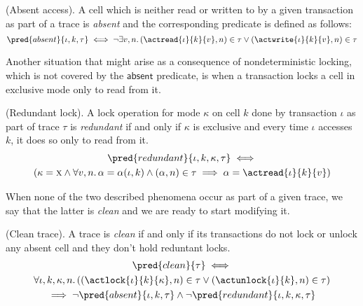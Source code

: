 \begin{defn}
	(Absent access).
	A cell which is neither read or written to by a given transaction as part of a trace is \emph{absent} and the corresponding predicate is defined as follows:
	\[
		\pred{absent}{\iota, k, \tau}
			\iff
		\lnot \exists v, n \ldotp (\actread{\iota}{k}{v}, n) \in \tau \lor (\actwrite{\iota}{k}{v}, n) \in \tau
	\]
\end{defn}

Another situation that might arise as a consequence of nondeterministic locking, which is not covered by the $\mathsf{absent}$ predicate, is when a transaction locks a cell in exclusive mode only to read from it.
\begin{defn}
	(Redundant lock).
	A lock operation for mode $\kappa$ on cell $k$ done by transaction $\iota$ as part of trace $\tau$ is \emph{redundant} if and only if $\kappa$ is exclusive and every time $\iota$ accesses $k$, it does so only to read from it.
	\begin{gather*}
		\pred{redundant}{\iota, k, \kappa, \tau}
			\iff \\
		\left( \kappa = \textsc{x} \land \forall v, n \ldotp \alpha = \alpha(\iota, k) \land (\alpha, n) \in \tau \implies \alpha = \actread{\iota}{k}{v} \right)
	\end{gather*}
\end{defn}

When none of the two described phenomena occur as part of a given trace, we say that the latter is \textit{clean} and we are ready to start modifying it.
\begin{defn}
	(Clean trace).
	A trace is \emph{clean} if and only if its transactions do not lock or unlock any absent cell and they don't hold reduntant locks.
	\begin{gather*}
		\pred{clean}{\tau} \iff \\
		\forall \iota, k, \kappa, n \ldotp
		\left( (\actlock{\iota}{k}{\kappa}, n) \in \tau \lor (\actunlock{\iota}{k}, n) \in \tau \right) \\
			\implies
		\lnot \pred{absent}{\iota, k, \tau} \land \lnot \pred{redundant}{\iota, k, \kappa, \tau}
	\end{gather*}
\end{defn}

